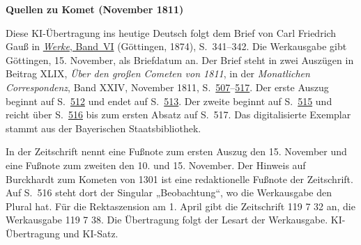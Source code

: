 \clearpage\thispagestyle{empty}
\begin{center}\textbf{Quellen zu Komet (November 1811)}\end{center}
\noindent Diese KI-Übertragung ins heutige Deutsch folgt dem Brief von Carl Friedrich Gauß in \href{https://gdz.sub.uni-goettingen.de/id/PPN236007467}{\textit{Werke}, Band~VI} (Göttingen, 1874), S.~341--342. Die Werkausgabe gibt Göttingen, 15. November, als Briefdatum an. Der Brief steht in zwei Auszügen in Beitrag XLIX, \textit{Über den großen Cometen von 1811}, in der \textit{Monatlichen Correspondenz}, Band XXIV, November 1811, S.~\href{https://api.digitale-sammlungen.de/iiif/image/v2/bsb10538613_00521/full/1600,/0/default.jpg}{507}--\href{https://api.digitale-sammlungen.de/iiif/image/v2/bsb10538613_00531/full/1600,/0/default.jpg}{517}. Der erste Auszug beginnt auf S.~\href{https://api.digitale-sammlungen.de/iiif/image/v2/bsb10538613_00526/full/1600,/0/default.jpg}{512} und endet auf S.~\href{https://api.digitale-sammlungen.de/iiif/image/v2/bsb10538613_00527/full/1600,/0/default.jpg}{513}. Der zweite beginnt auf S.~\href{https://api.digitale-sammlungen.de/iiif/image/v2/bsb10538613_00529/full/1600,/0/default.jpg}{515} und reicht über S.~\href{https://api.digitale-sammlungen.de/iiif/image/v2/bsb10538613_00530/full/1600,/0/default.jpg}{516} bis zum ersten Absatz auf S.~517. Das digitalisierte Exemplar stammt aus der Bayerischen Staatsbibliothek.
\par\smallskip\noindent In der Zeitschrift nennt eine Fußnote zum ersten Auszug den 15. November und eine Fußnote zum zweiten den 10. und 15. November. Der Hinweis auf Burckhardt zum Kometen von 1301 ist eine redaktionelle Fußnote der Zeitschrift. Auf S.~516 steht dort der Singular „Beobachtung“, wo die Werkausgabe den Plural hat. Für die Rektaszension am 1. April gibt die Zeitschrift 119 7 32 an, die Werkausgabe 119 7 38. Die Übertragung folgt der Lesart der Werkausgabe. KI-Übertragung und KI-Satz.
\clearpage
